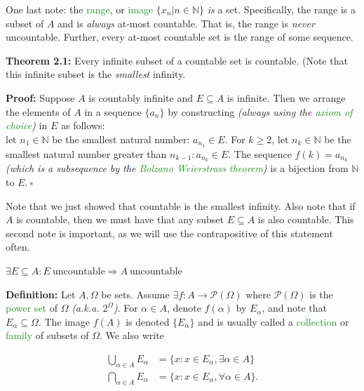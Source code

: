 \documentclass{article}
\newcommand{\Divides}{\mathbin{\big|}}
\begin{document}
One last note: the \textcolor{ForestGreen}{range}, or \textcolor{ForestGreen}{image} $\{x_n \Divides n \in \mathbb{N}\}$ \textit{is} a set. Specifically, the range is a subset of $A$ and is \textit{always} at-most countable. That is, the range is \textit{never} uncountable. Further, every at-most countable set is the range of some sequence.

\textbf{Theorem 2.1:} Every infinite subset of a countable set is countable. (Note that this infinite subset is the \textit{smallest} infinity.

\textbf{Proof:} Suppose $A$ is countably infinite and $E \subseteq A$ is infinite. Then we arrange the elements of $A$ in a sequence $\{a_n\}$ by constructing \textit{(always using the \textcolor{ForestGreen}{axiom of choice})} in $E$ as follows:\\

let $n_1 \in \mathbb{N}$ be the smallest natural number: $a_{n_1} \in E$. For $k \geq 2$, let $n_k \in \mathbb{N}$ be the smallest natural number greater than $n_{k-1}:a_{n_k} \in E$. The sequence $f(k)=a_{n_k}$ \textit{(which is a subsequence by the \textcolor{ForestGreen}{Bolzano Weierstrass theorem})} is a bijection from $\mathbb{N}$ to $E. \ \square$

Note that we just showed that countable is the smallest infinity. Also note that if $A$ is countable, then we must have that any subset $E \subseteq A$ is also countable. This second note is important, as we will use the contrapositive of this statement often. 

\begin{center}
    $\exists E \subseteq A: E \ \text{uncountable} \Longrightarrow A \ \text{uncountable}$
\end{center}

\textbf{Definition:} Let $A, \Omega$ be sets. Assume $\exists f:A \longrightarrow \mathcal{P}(\Omega)$ where $\mathcal{P}(\Omega)$ is the \textcolor{ForestGreen}{power set} of $\Omega$ \textit{(a.k.a. $2^{\Omega}$)}. For $\alpha \in A$, denote $f(\alpha)$ by $E_{\alpha}$, and note that $E_{\alpha} \subseteq \Omega$. The image $f(A)$ is denoted $\{E_{\alpha}\}$ and is usually called a \textcolor{ForestGreen}{collection} or \textcolor{ForestGreen}{family} of subsets of $\Omega$. We also write

\begin{align*}
    \bigcup_{\alpha \in A} E_{\alpha} &= \{x:x \in E_{\alpha}, \exists \alpha \in A\}\\
    \bigcap_{\alpha \in A} E_{\alpha} &= \{x:x \in E_{\alpha}, \forall \alpha \in A\}.
\end{align*}
\end{document}
